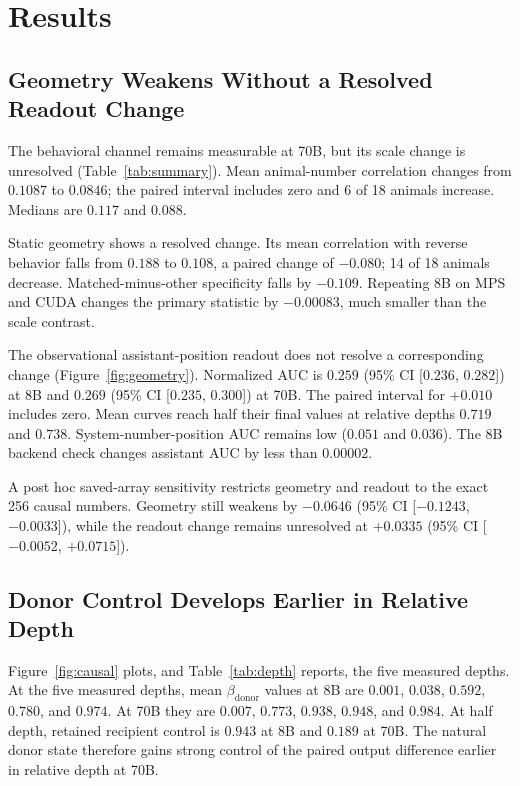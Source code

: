\documentclass[letterpaper]{article}
\newcommand{\CI}[2]{95\% CI [#1, #2]}
\begin{document}
\section{Results}

\subsection{Geometry Weakens Without a Resolved Readout Change}

The behavioral channel remains measurable at 70B, but its scale change is
unresolved (Table~\ref{tab:summary}). Mean animal-number correlation changes
from $0.1087$ to $0.0846$; the paired interval includes zero and 6 of 18 animals
increase. Medians are $0.117$ and $0.088$.

Static geometry shows a resolved change. Its mean correlation with reverse behavior
falls from $0.188$ to $0.108$, a paired change of $-0.080$; 14 of 18 animals
decrease. Matched-minus-other specificity falls by $-0.109$. Repeating 8B on
MPS and CUDA changes the primary statistic by $-0.00083$, much smaller than the
scale contrast.

The observational assistant-position readout does not resolve a corresponding
change (Figure~\ref{fig:geometry}). Normalized AUC is $0.259$
(\CI{$0.236$}{$0.282$}) at 8B and $0.269$
(\CI{$0.235$}{$0.300$}) at 70B. The paired interval for $+0.010$ includes zero.
Mean curves reach half their final values at relative depths $0.719$ and
$0.738$. System-number-position AUC remains low ($0.051$ and $0.036$). The 8B
backend check changes assistant AUC by less than $0.00002$.

A post hoc saved-array sensitivity restricts geometry and readout to the exact
256 causal numbers. Geometry still weakens by $-0.0646$
(\CI{$-0.1243$}{$-0.0033$}), while the readout change remains unresolved at
$+0.0335$ (\CI{$-0.0052$}{$+0.0715$}).

\subsection{Donor Control Develops Earlier in Relative Depth}

Figure~\ref{fig:causal} plots, and Table~\ref{tab:depth} reports, the five
measured depths.
At the five measured depths, mean $\beta_{\mathrm{donor}}$ values at 8B are
$0.001$, $0.038$, $0.592$, $0.780$, and $0.974$. At 70B they are
$0.007$, $0.773$, $0.938$, $0.948$, and $0.984$. At half depth, retained recipient
control is $0.943$ at 8B and $0.189$ at 70B. The natural donor state therefore
gains strong control of the paired output difference earlier in relative depth
at 70B.
\end{document}
